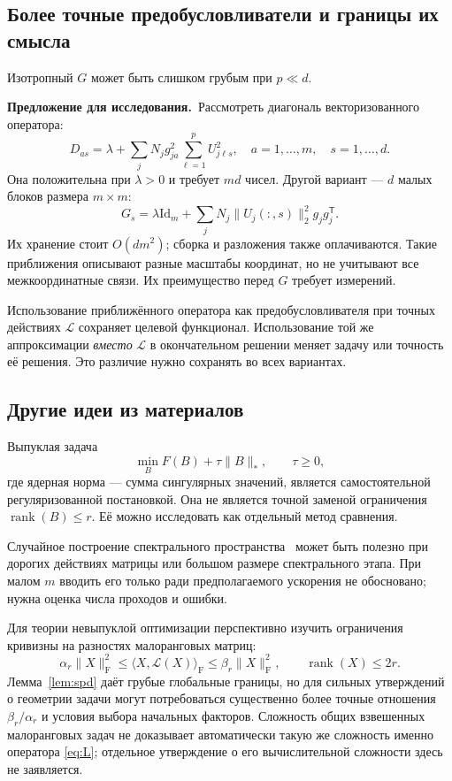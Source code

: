 \documentclass[11pt,a4paper]{article}
\numberwithin{equation}{section}
\theoremstyle{remark}
\newcommand{\Id}{\mathrm{Id}}
\newcommand{\T}{^{\mathsf T}}
\newcommand{\F}{_{\mathrm F}}
\newcommand{\ip}[2]{\langle #1,#2\rangle_{\mathrm F}}
\DeclareMathOperator{\rank}{rank}
\newcommand{\proposal}{\par\noindent\textbf{Предложение для исследования.}\ }
\begin{document}
\subsection{Более точные предобусловливатели и границы их смысла}
Изотропный $G$ может быть слишком грубым при $p\ll d$.
\proposal Рассмотреть диагональ векторизованного оператора:
\begin{equation}\label{eq:diagprecond}
 D_{as}=\lambda+\sum_jN_jg_{ja}^2\sum_{\ell=1}^p U_{j\ell s}^2,
 \quad a=1,\ldots,m,\quad s=1,\ldots,d.
\end{equation}
Она положительна при $\lambda>0$ и требует $md$ чисел.
Другой вариант --- $d$ малых блоков размера $m\times m$:
\[
 G_s=\lambda\Id_m+\sum_jN_j\|U_j(:,s)\|_2^2g_jg_j\T.
\]
Их хранение стоит $O(dm^2)$; сборка и разложения также оплачиваются.
Такие приближения описывают разные масштабы координат, но не учитывают
все межкоординатные связи. Их преимущество перед $G$ требует измерений.

Использование приближённого оператора как предобусловливателя при точных
действиях $\mathcal L$ сохраняет целевой функционал. Использование той же
аппроксимации \emph{вместо} $\mathcal L$ в окончательном решении меняет
задачу или точность её решения. Это различие нужно сохранять во всех вариантах.

\subsection{Другие идеи из материалов}
Выпуклая задача
\[
 \min_B F(B)+\tau\|B\|_*,\qquad\tau\ge0,
\]
где ядерная норма --- сумма сингулярных значений, является самостоятельной
регуляризованной постановкой. Она не является точной заменой ограничения
$\rank(B)\le r$. Её можно исследовать как отдельный метод сравнения.

Случайное построение спектрального пространства~\cite{halko} может быть
полезно при дорогих действиях матрицы или большом размере спектрального
этапа. При малом $m$ вводить его только ради предполагаемого ускорения
не обосновано; нужна оценка числа проходов и ошибки.

Для теории невыпуклой оптимизации перспективно изучить ограничения
кривизны на разностях малоранговых матриц:
\[
 \alpha_r\|X\|\F^2\le\ip{X}{\mathcal L(X)}
 \le\beta_r\|X\|\F^2,\qquad\rank(X)\le2r.
\]
Лемма~\ref{lem:spd} даёт грубые глобальные границы, но для сильных
утверждений о геометрии задачи могут потребоваться существенно более
точные отношения $\beta_r/\alpha_r$ и условия выбора начальных факторов.
Сложность общих взвешенных малоранговых задач не доказывает автоматически
такую же сложность именно оператора \eqref{eq:L}; отдельное утверждение
о его вычислительной сложности здесь не заявляется.
\end{document}
